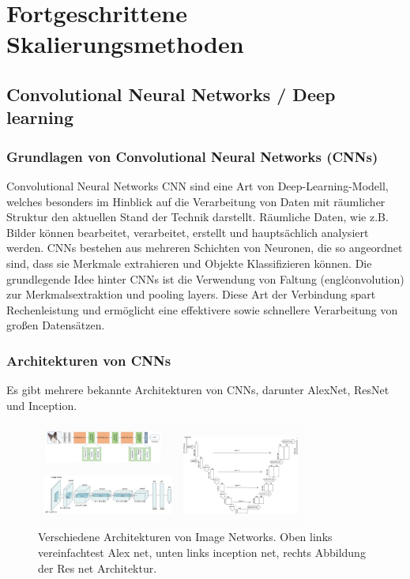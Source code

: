 


\chapter{Fortgeschrittene Skalierungsmethoden}
\section{Convolutional Neural Networks / Deep learning}
    \subsection{Grundlagen von Convolutional Neural Networks (CNNs)}
        Convolutional Neural Networks \ac{CNN} sind eine Art von Deep-Learning-Modell, welches besonders im Hinblick auf die Verarbeitung von Daten mit räumlicher Struktur den aktuellen Stand der Technik darstellt.
        Räumliche Daten, wie z.B. Bilder können bearbeitet, verarbeitet, erstellt und hauptsächlich analysiert werden.
        CNNs bestehen aus mehreren Schichten von Neuronen, die so angeordnet sind, dass sie Merkmale extrahieren und Objekte Klassifizieren können.
        Die grundlegende Idee hinter CNNs ist die Verwendung von Faltung (engl\. convolution) zur Merkmalsextraktion und pooling layers.
        Diese Art der Verbindung spart Rechenleistung und ermöglicht eine effektivere sowie schnellere Verarbeitung von großen Datensätzen.
~
    \subsection{Architekturen von CNNs}
    
        Es gibt mehrere bekannte Architekturen von CNNs, darunter AlexNet, ResNet und Inception.

        \begin{figure}[h]
            \centering
            \includegraphics[width=0.8\textwidth]{img/different_types_of_cnn_nets.jpg}
            \caption{Verschiedene Architekturen von Image Networks. Oben links vereinfachtest Alex net, unten links inception net, rechts Abbildung der Res net Architektur.}
            \label{fig:different_types_of_cnn_nets}
        \end{figure}
        
